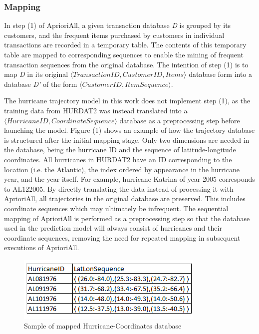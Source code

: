 \documentclass[12pt,conference]{IEEEtran}
\begin{document}
\subsubsection{Mapping}

In step (1) of AprioriAll, a given transaction database \textit{D} is grouped by its customers, and the frequent items purchased by customers in individual transactions are recorded in a temporary table. The contents of this temporary table are mapped to corresponding sequences to enable the mining of frequent transaction sequences from the original database. The intention of step (1) is to map \textit{D} in its original $\langle TransactionID, CustomerID, Items\rangle$ database form into a database \textit{D'} of the form $\langle CustomerID, ItemSequence\rangle$. 

The hurricane trajectory model in this work does not implement step (1), as the training data from HURDAT2 was instead translated into a $\langle HurricaneID, CoordinateSequence\rangle$ database as a preprocessing step before launching the model. Figure (1) shows an example of how the trajectory database is structured after the initial mapping stage. Only two dimensions are needed in the database, being the hurricane ID and the sequence of latitude-longitude coordinates. All hurricanes in HURDAT2 have an ID corresponding to the location (i.e. the Atlantic), the index ordered by appearance in the hurricane year, and the year itself. For example, hurricane Katrina of year 2005 corresponds to AL122005. By directly translating the data instead of processing it with AprioriAll, all trajectories in the original database are preserved. This includes coordinate sequences which may ultimately be infrequent. The sequential mapping of AprioriAll is performed as a preprocessing step so that the database used in the prediction model will always consist of hurricanes and their coordinate sequences, removing the need for repeated mapping in subsequent executions of AprioriAll.

\begin{figure}[ht]
\caption{Sample of mapped Hurricane-Coordinates database}
\centering
\includegraphics[scale=1.0]{hurricane-table-sample}
\end{figure}
\end{document}
